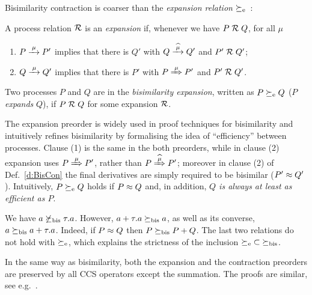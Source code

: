 Bisimilarity contraction is coarser than 
the \emph{expansion relation}
$\mathrel{\succeq_{\rm{e}}}$~\cite{arun1992efficiency,sangiorgi2015equations}:
\begin{definition}[expansion]
\label{d:expa}
A process relation ${{\cal R}}$
  is an \emph{expansion} if, whenever
we have $P\mathrel{\cal R} Q$, for all $\mu$
 \begin{enumerate}
 \item   $P \arr\mu P'$ implies that there is $Q'$ with $Q \arcap \mu  Q'$
  and $P' \mathrel{\cal R} Q'$;
 \item $Q \arr\mu Q'$   implies that there is $P'$ with $P \Arr \mu P'$ and $P' \mathrel{\cal R} Q'$.
 \end{enumerate}
Two processes $P$ and $Q$ are in the \emph{bisimilarity
  expansion}, written as $P \mathrel{\succeq_{\rm{e}}} Q$ ($P$ \emph{expands} $Q$),
 if $P \mathrel{\cal R} Q$ for some expansion ${\cal R}$.
 \end{definition}
The expansion preorder is widely used in proof techniques for bisimilarity and
intuitively refines bisimilarity by 
formalising the idea of ``efficiency'' between processes.
Clause (1) is the same in the both preorders, while in clause (2) expansion uses 
$P \Arr \mu P'$, rather than $P \Arcap \mu P'$; 
moreover in clause (2) of Def.~\ref{d:BisCon} the final derivatives
are simply required to be bisimilar ($P' \approx Q'$).
Intuitively, $P \mathrel{\succeq_{\rm{e}}} Q$ holds if $P\approx Q$ and, in addition, \emph{$Q$
  is always at least as efficient as $P$}.

\begin{example}
\label{exa:contr}
We have %
 $ a \not  \mathrel{\succeq_{\rm{bis}}} \tau. a$. However,
$a+ \tau . a \mathrel{\succeq_{\rm{bis}}} a$, as well as its converse, 
$  a \mathrel{\succeq_{\rm{bis}}} a +
\tau . a $. Indeed, if $P \approx Q$ then 
$  P  \mathrel{\succeq_{\rm{bis}}} P +Q$. The last two relations do not hold with 
$\mathrel{\succeq_{\rm{e}}}$, which explains the strictness of the inclusion
 ${\mathrel{\succeq_{\rm{e}}}} \subset {\mathrel{\succeq_{\rm{bis}}}}$. 
\end{example} 

In the same way as bisimilarity, both the expansion and the
contraction preorders are preserved by all CCS operators except the
summation. The proofs are similar, see e.g.~\cite{sangiorgi2017equations}.

